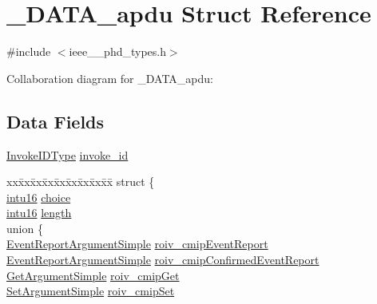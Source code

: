 \hypertarget{struct___d_a_t_a__apdu}{}\section{\+\_\+\+D\+A\+T\+A\+\_\+apdu Struct Reference}
\label{struct___d_a_t_a__apdu}


{\ttfamily \#include $<$ieee\+\_\+\_\+phd\+\_\+types.\+h$>$}



Collaboration diagram for \+\_\+\+D\+A\+T\+A\+\_\+apdu\+:
\subsection*{Data Fields}
\begin{DoxyCompactItemize}
\item 
\hyperlink{ieee__11073__phd__types_8h_ade454fc67c6dfd79940cb98ec80935ee}{Invoke\+I\+D\+Type} \hyperlink{struct___d_a_t_a__apdu_a204a1befd9f114ab6f2192071d0c367d}{invoke\+\_\+id}
\item 
\begin{tabbing}
xx\=xx\=xx\=xx\=xx\=xx\=xx\=xx\=xx\=\kill
struct \{\\
\>\hyperlink{ieee__11073__phd__types_8h_a3561595d2aa7416532e1c9910abd076d}{intu16} \hyperlink{struct___d_a_t_a__apdu_a034761fd73babd925f56cbb254ce4fb2}{choice}\\
\>\hyperlink{ieee__11073__phd__types_8h_a3561595d2aa7416532e1c9910abd076d}{intu16} \hyperlink{struct___d_a_t_a__apdu_a3743679e4ff85e3e1b3fc2e59973fbb3}{length}\\
\>union \{\\
\>\>\hyperlink{ieee__11073__phd__types_8h_afdb1fb6ea2c3f1d103379d4340e3f967}{EventReportArgumentSimple} \hyperlink{struct___d_a_t_a__apdu_a9ffa1370a282f1471a2be8db6cd1fb67}{roiv\_cmipEventReport}\\
\>\>\hyperlink{ieee__11073__phd__types_8h_afdb1fb6ea2c3f1d103379d4340e3f967}{EventReportArgumentSimple} \hyperlink{struct___d_a_t_a__apdu_a3c35fcfb5e84ebd7372af2c70f692fa8}{roiv\_cmipConfirmedEventReport}\\
\>\>\hyperlink{ieee__11073__phd__types_8h_a53dff656d196d7dd00eb60e97b4d4d2f}{GetArgumentSimple} \hyperlink{struct___d_a_t_a__apdu_a88b911702e92809aea7fb10d97759677}{roiv\_cmipGet}\\
\>\>\hyperlink{ieee__11073__phd__types_8h_a43ff8ecfd35a12bcb7eb4bc974f1ffb2}{SetArgumentSimple} \hyperlink{struct___d_a_t_a__apdu_afe09edc4f13e8f7868ce9462124a7b4b}{roiv\_cmipSet}\\

\end{tabbing}
\end{DoxyCompactItemize}
